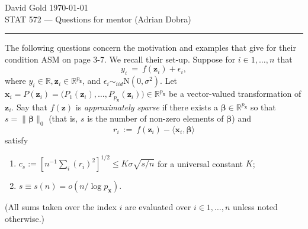 \documentclass{article}
\newcommand{\benn}{\begin{equation*}}
\newcommand{\eenn}{\end{equation*}}
\newcommand{\R}{\ensuremath{\mathbb{R}}}
\newcommand{\gb}{\beta}
\newcommand{\gep}{\epsilon}
\newcommand{\gth}{\theta}
\newcommand{\gs}{\sigma}
\newcommand{\Normal}{\mathrm{N}}
\newcommand{\bs}[1]{\boldsymbol{#1}}
\numberwithin{equation}{section}
\begin{document}

\newcommand{\tp}{\mathrm{T}}

\newcommand{\z}{\bs{z}}
\newcommand{\x}{\bs{x}}
\newcommand{\w}{\bs{w}}
\newcommand{\inst}{\bs{u}}
\newcommand{\instc}{u}

\newcommand{\pz}{{p_{\z}}}
\newcommand{\pw}{{p_{\w}}}
\newcommand{\px}{{p_{\x}}}
\newcommand{\pinst}{{p_{\inst}}}

\newcommand{\reg}{\gth}
\newcommand{\eft}{\gth}
\newcommand{\efthat}{\hat{\eft}}
\newcommand{\nuis}{\bs{\gamma}}
\newcommand{\sdh}{\gs_h}
\newcommand{\sdv}{\gs_v}
\newcommand{\covhv}{\gs_{hv}}

\newcommand{\efc}{\bs{\gamma}}
\newcommand{\W}{\bs{W}}
\newcommand{\Z}{\bs{Z}}
\newcommand{\erry}{\gep}
\newcommand{\pd}{\partial}

\newcommand{\gbt}{\bs{\gb}}
\newcommand{\argb}{\bs{b}}



\noindent David Gold \hfill \today \\
STAT 572 --- Questions for mentor (Adrian Dobra) \vspace{.2em}\hrule
\vspace{1em}

\noindent The following questions concern the motivation and examples that \cite{BCH11} give for their condition ASM on page 3-7. We recall their set-up. Suppose for $i\in1,\ldots,n$ that
\benn
	y_i \ = \ f(\z_i) + \gep_i,
\eenn
where $y_i \in \R, \z_i\in\R^\pz$, and $\gep_i \sim_{iid} \Normal(0,\gs^2)$. Let $\x_i = P(\z_i) = \big(P_1(\z_i),\ldots,P_\px(\z_i)\big) \in \R^\px$ be a vector-valued transformation of $\z_i$. Say that $f(\z)$ is \emph{approximately sparse} if there exists a $\gbt \in\R^{\px}$ so that $s = \|\gbt\|_0$ (that is, $s$ is the number of non-zero elements of $\gbt$) and 
\benn
	r_i \ := \ f(\z_i) - \langle \x_i, \gbt \rangle
\eenn
satisfy
\begin{enumerate}
\itemsep0em
	\item  $c_s := \left[n^{-1}\sum_i (r_i)^2\right]^{1/2} \leq K\gs\sqrt{s/n}$ for a universal constant $K$;
	\item  $s \equiv s(n) = o(n/\log\px)$. 
\end{enumerate}
(All sums taken over the index $i$ are evaluated over $i\in1,\ldots,n$ unless noted otherwise.)
\end{document}
